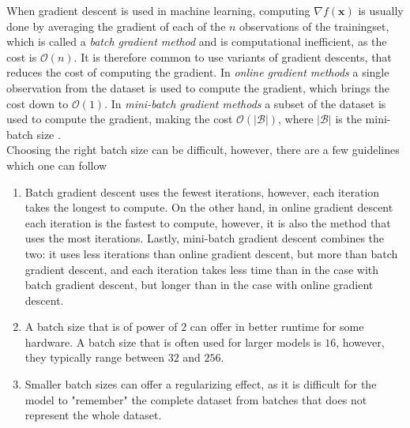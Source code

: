 \documentclass[./main.tex]{subfiles}
\begin{document}
\noindent When gradient descent is used in machine learning, computing $\nabla f(\bm{x})$ is usually done by averaging the gradient of each of the $n$ observations of the trainingset, which is called a \textit{batch gradient method} and is computational inefficient, as the cost is $\mathcal{O}(n)$. It is therefore common to use variants of gradient descents, that reduces the cost of computing the gradient. In \textit{online gradient methods} a single observation from the dataset is used to compute the gradient, which brings the cost down to $\mathcal{O}(1)$. In \textit{mini-batch gradient methods} a subset of the dataset is used to compute the gradient, making the cost $\mathcal{O}(|\mathcal{B}|)$, where $|\mathcal{B}|$ is the mini-batch size \cite{d2l}. \\
Choosing the right batch size can be difficult, however, there are a few guidelines which one can follow \cite{EML_optimization} \cite{d2l}
\begin{enumerate}
    \item Batch gradient descent uses the fewest iterations, however, each iteration takes the longest to compute. On the other hand, in online gradient descent each iteration is the fastest to compute, however, it is also the method that uses the most iterations. Lastly, mini-batch gradient descent combines the two: it uses less iterations than online gradient descent, but more than batch gradient descent, and each iteration takes less time than in the case with batch gradient descent, but longer than in the case with online gradient descent.
    \item A batch size that is of power of $2$ can offer in better runtime for some hardware. A batch size that is often used for larger models is $16$, however, they typically range between $32$ and $256$.
    \item Smaller batch sizes can offer a regularizing effect, as it is difficult for the model to "remember" the complete dataset from batches that does not represent the whole dataset.
\end{enumerate}
\end{document}
